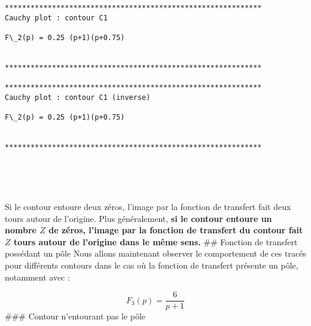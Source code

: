    \begin{Verbatim}[commandchars=\\\{\}]
************************************************************
Cauchy plot : contour C1

F\_2(p) = 0.25 (p+1)(p+0.75)


************************************************************

************************************************************
Cauchy plot : contour C1 (inverse)

F\_2(p) = 0.25 (p+1)(p+0.75)


************************************************************

    \end{Verbatim}

    \begin{center}
    \end{center}
    { \hspace*{\fill} \\}
    
    \begin{center}
    \end{center}
    { \hspace*{\fill} \\}
    
    Si le contour entoure deux zéros, l'image par la fonction de transfert
fait deux tours autour de l'origine. Plus généralement, \textbf{si le
contour entoure un nombre \(Z\) de zéros, l'image par la fonction de
transfert du contour fait \(Z\) tours autour de l'origine dans le même
sens.} \#\# Fonction de transfert possédant un pôle Nous allons
maintenant observer le comportement de ces tracés pour différents
contours dans le cas où la fonction de transfert présente un pôle,
notamment avec :

\[
F_3(p)=\dfrac{6}{p+1}
\] \#\#\# Contour n'entourant pas le pôle

